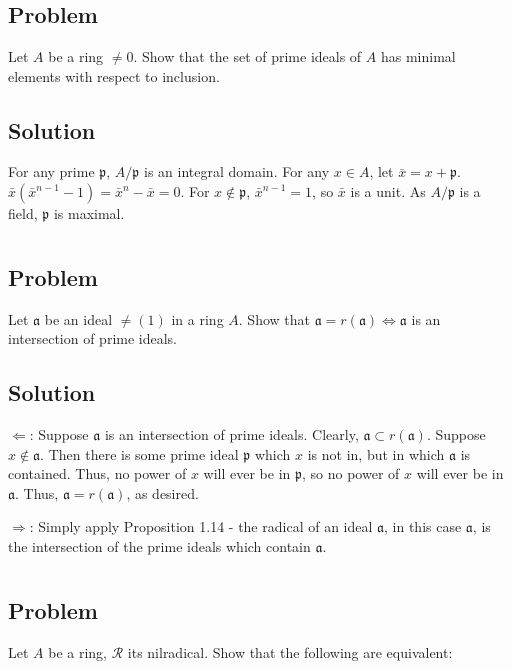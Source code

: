 \documentclass[book,12pt,oneside,openany]{memoir}
\begin{document}
\section{}
\subsection{Problem}
Let $A$ be a ring $\neq 0$. Show that the set of prime ideals of $A$ has minimal elements with respect to inclusion.
\subsection{Solution}
For any prime $\mathfrak p$, $A/\mathfrak p$ is an integral domain.
For any $x\in A$, let $\bar{x}=x+\mathfrak p$.
$\bar{x}(\bar{x}^{n-1}-1)=\bar{x}^n-\bar{x}=0$.
For $x\notin\mathfrak p$, $\bar{x}^{n-1}=1$, so $\bar{x}$ is a unit.
As $A/\mathfrak p$ is a field, $\mathfrak p$ is maximal.


\section{}
\subsection{Problem}
Let $\mathfrak{a}$ be an ideal $\neq (1)$ in a ring $A$. Show that $\mathfrak{a} = r(\mathfrak{a}) \Leftrightarrow \mathfrak{a}$ is an intersection of prime ideals.
\subsection{Solution}

$\Leftarrow$: Suppose $\mathfrak{a}$ is an intersection of prime ideals. Clearly, $\mathfrak{a} \subset r(\mathfrak{a})$. Suppose $x \notin \mathfrak{a}$. Then there is some prime ideal $\mathfrak{p}$ which $x$ is not in, but in which $\mathfrak{a}$ is contained. Thus, no power of $x$ will ever be in $\mathfrak{p}$, so no power of $x$ will ever be in $\mathfrak{a}$. Thus, $\mathfrak{a} = r(\mathfrak{a})$, as desired.

$\Rightarrow$:  Simply apply Proposition 1.14 - the radical of an ideal $\mathfrak{a}$, in this case $\mathfrak{a}$, is the intersection of the prime ideals which contain $\mathfrak{a}$.
\section{}
\subsection{Problem}
Let $A$ be a ring, $\mathcal{R}$ its nilradical. Show that the following are equivalent:
\end{document}
